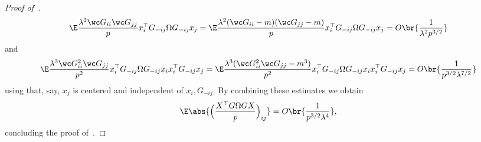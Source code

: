 \begin{proof}[Proof of~]
\begin{equation}
        \E \frac{\lambda^{2}\wc G_{ii}\wc G_{jj}}{p} x_i^\top G_{-ij}\Omega G_{-ij} x_j= \E \frac{\lambda^{2}(\wc G_{ii}-m)(\wc G_{jj}-m)}{p} x_i^\top G_{-ij}\Omega G_{-ij} x_j = O\br{\frac{1}{\lambda^2 p^{3/2}}}
    \end{equation}
    and
    \begin{equation}
        \E\frac{\lambda^{3}\wc G_{ii}^2\wc G_{jj}}{p^2} x_i^\top G_{-ij}\Omega G_{-ij}x_ix_i^\top G_{-ij} x_j = \E \frac{\lambda^{3}(\wc G_{ii}^2\wc G_{jj}-m^3)}{p^2} x_i^\top G_{-ij}\Omega G_{-ij}x_ix_i^\top G_{-ij} x_j = O\br{\frac{1}{p^{3/2}\lambda^{7/2}}}
    \end{equation}
    using that, say, $x_j$ is centered and independent of $x_i, G_{-ij}$. By combining these estimates we obtain
    \begin{equation}
        \E \abs{\Bigl(\frac{X^\top G\Omega GX}{p}\Bigr)_{ij}} = O\br{\frac{1}{p^{3/2}\lambda^4}},
    \end{equation}
    concluding the proof of~.


\end{proof}
